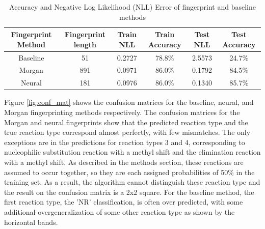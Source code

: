 \begin{table}
    \centering
    \label{tab:cross_val_results}
    \begin{tabular}{|c|c|c|c|c|c|}%
        \hline
         \textbf{Fingerprint Method} & \textbf{Fingerprint length} & \textbf{Train NLL} & \textbf{Train Accuracy} & \textbf{Test NLL} &  \textbf{Test Accuracy} \\ 
        \hline
        Baseline & 51 & 0.2727 & 78.8\% & 2.5573 & 24.7\%  \\ 
        \hline
        Morgan  & 891 & 0.0971 & 86.0\%  & 0.1792 & 84.5\%  \\ 
        Neural  &  181 & 0.0976 & 86.0\% & 0.1340 & 85.7\% \\ 
    \end{tabular} 
    \caption{Accuracy and Negative Log Likelihood (NLL) Error of fingerprint and baseline methods} 
\end{table}  

Figure \ref{fig:conf_mat} shows the confusion matrices for the baseline, neural, and Morgan fingerprinting methods respectively. The confusion matrices for the Morgan and neural fingerprints show that the predicted reaction type and the true reaction type correspond almost perfectly, with few mismatches. The only exceptions are in the predictions for reaction types 3 and 4, corresponding to nucleophilic substitution reaction with a methyl shift and the elimination reaction with a methyl shift. As described in the methods section, these reactions are assumed to occur together, so they are each assigned probabilities of 50\% in the training set. As a result, the algorithm cannot distinguish these reaction type and the result on the confusion matrix is a 2x2 square. For the baseline method, the first reaction type, the 'NR' classification, is often over predicted, with some additional overgeneralization of some other reaction type as shown by the horizontal bands.


